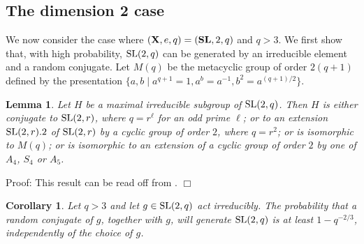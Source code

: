 \documentclass[12pt]{article}
\newtheorem{lemma}[definition]{Lemma}
\newtheorem{corollary}[definition]{Corollary}
\newenvironment{proof}{\normalsize {\sc Proof}:}{{\hfill $\Box$ \\}}
\def\SL{{\rm SL}}
\def\X{{\rm X}}
\def\X{{\bf X}}
\begin{document}
\subsection{The dimension 2 case} \label{two-factor}
We now consider the case where $(\X, e,q)=(\mathbf{SL}, 2,q)$ and $q>3$.
We first show that, with high probability, $\SL(2, q)$ can be generated
by an irreducible element and a random conjugate.  Let $M(q)$
be the metacyclic group of order $2(q+1)$ defined by the presentation
$\{ a,b\; \vert \; a^{q+1}=1, a^b = a^{-1}, b^2=a^{(q+1)/2}\}$.
\begin{lemma}\label{sl2qgen}
Let $H$ be a maximal irreducible subgroup of
$\SL(2,q)$.
Then $H$ is either conjugate to $\SL(2,r)$,
where $q=r^\ell$ for an odd prime $\ell$;
or to an extension  $\SL(2,r).2$ of $\SL(2,r)$ by
a cyclic group of order $2$, where $q=r^2$;
or is isomorphic to $M(q)$;
or is isomorphic to an extension of a cyclic group of order $2$
by one of $A_4$, $S_4$ or $A_5$.
\end{lemma}
\begin{proof}
This result can be read off from \cite[Hauptsatz II.8.27]{Huppert67}.
\end{proof}
\begin{corollary}\label{psl2q}
Let $q > 3$ and let $g\in\SL(2,q)$ act irreducibly.  The
probability that a random conjugate of $g$, together with $g$, will
generate $\SL(2,q)$ is at least $1 - q^{-2/3}$,
independently of the choice of $g$.
\end{corollary}
\end{document}
